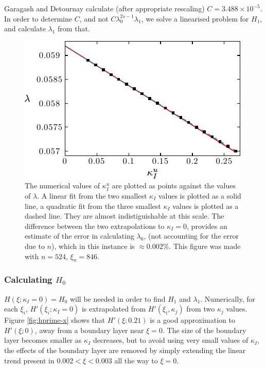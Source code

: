 \documentclass{jfm}
\begin{document}
Garagash and Detournay calculate (after appropriate rescaling) 
$C = 3.488 \times 10^{-5}$. In order to determine $C$, and not 
$C\lambda_0^{2s-1}\lambda_1$, 
we solve a linearised problem for $H_1$, and calculate $\lambda_1$ from that.
\begin{figure}
  \centerline{\includegraphics{./../../Graphs/l0-edited.pdf}}
  \caption{The numerical values of $\kappa_I^u$ are plotted as points against
           the values of $\lambda$. A linear fit from the two smallest $\kappa_I$ 
           values is plotted 
           as a solid line, a quadratic fit from the three smallest $\kappa_I$ 
           values is plotted as a dashed line.
           They are almost indistiguishable at this scale. 
           The difference between the two extrapolations to $\kappa_I=0$,  
           provides an estimate of the error in calculating $\lambda_0$, 
           (not accounting for the error due to $n$), which in this instance is 
           $\approx 0.002\%$. This figure was made with $n=524$, $\xi_n=846$. 
           }\label{fig:l0}
\end{figure}
%
\subsubsection{Calculating $H_0$ }
$H(\xi ; \kappa_I=0) = H_0$ will be needed in order to find $H_1$ and $\lambda_1$.
Numerically, for each $\xi_i$, $H'(\xi_i; \kappa_I = 0)$ is extrapolated
from $H'(\xi_i, \kappa_j)$ from two $\kappa_j$ values. Figure 
\ref{fig:hprime-x} shows that $H'(\xi; 0.21)$ 
is a good approximation to $H'(\xi;0)$, away from a boundary 
layer near $\xi=0$. The size of the boundary layer becomes smaller as $\kappa_I$
decreases, but to avoid using very small values of $\kappa_I$, the effects
of the boundary layer are removed by simply extending the linear trend present
in $0.002 < \xi < 0.003$ all the way to $\xi=0$.
%
%
\end{document}
